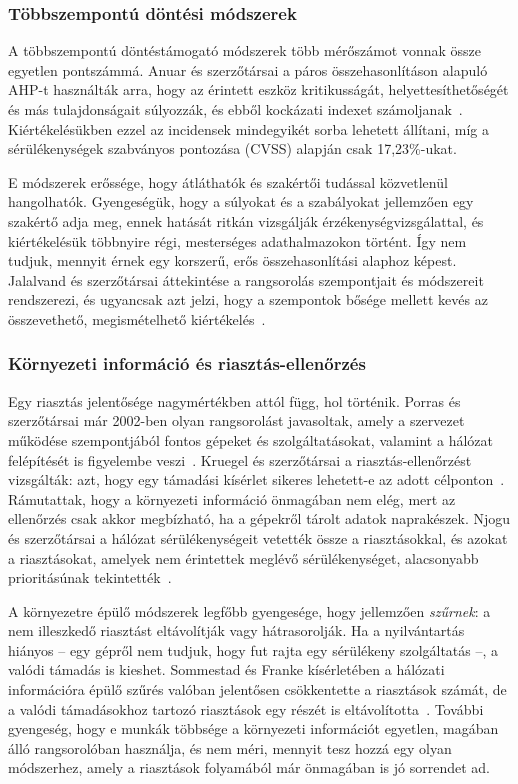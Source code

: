 \subsubsection{Többszempontú döntési módszerek}
A többszempontú döntéstámogató módszerek több mérőszámot vonnak össze egyetlen pontszámmá. Anuar és szerzőtársai a páros összehasonlításon alapuló \ac{AHP}-t használták arra, hogy az érintett eszköz kritikusságát, helyettesíthetőségét és más tulajdonságait súlyozzák, és ebből kockázati indexet számoljanak~\cite{anuar2012}. Kiértékelésükben ezzel az incidensek mindegyikét sorba lehetett állítani, míg a sérülékenységek szabványos pontozása (\ac{CVSS}) alapján csak 17,23\%-ukat.

E módszerek erőssége, hogy átláthatók és szakértői tudással közvetlenül hangolhatók. Gyengeségük, hogy a súlyokat és a szabályokat jellemzően egy szakértő adja meg, ennek hatását ritkán vizsgálják érzékenységvizsgálattal, és kiértékelésük többnyire régi, mesterséges
adathalmazokon történt. Így nem tudjuk, mennyit érnek egy korszerű, erős összehasonlítási alaphoz képest. Jalalvand és szerzőtársai áttekintése a rangsorolás szempontjait és módszereit rendszerezi, és ugyancsak azt jelzi, hogy a szempontok bősége mellett kevés az összevethető, megismételhető kiértékelés~\cite{jalalvand2024}.

\subsubsection{Környezeti információ és riasztás-ellenőrzés}
Egy riasztás jelentősége nagymértékben attól függ, hol történik. Porras és szerzőtársai már 2002-ben olyan rangsorolást javasoltak, amely a szervezet működése szempontjából fontos gépeket és szolgáltatásokat, valamint a hálózat felépítését is figyelembe veszi~\cite{porras2002}. Kruegel és szerzőtársai a riasztás-ellenőrzést vizsgálták: azt, hogy egy támadási kísérlet sikeres lehetett-e az adott célponton~\cite{kruegel2004verification}. Rámutattak, hogy a környezeti információ önmagában nem elég, mert az ellenőrzés csak akkor megbízható, ha a gépekről tárolt adatok naprakészek. Njogu és szerzőtársai a hálózat sérülékenységeit vetették össze a riasztásokkal, és azokat a riasztásokat, amelyek nem érintettek meglévő sérülékenységet, alacsonyabb prioritásúnak tekintették~\cite{njogu2012}.

A környezetre épülő módszerek legfőbb gyengesége, hogy jellemzően \emph{szűrnek}: a nem illeszkedő riasztást eltávolítják vagy hátrasorolják. Ha a nyilvántartás hiányos -- egy gépről nem tudjuk, hogy fut rajta egy sérülékeny szolgáltatás --, a valódi támadás is kieshet. Sommestad és Franke kísérletében a hálózati információra épülő szűrés valóban jelentősen csökkentette a riasztások számát, de a valódi támadásokhoz tartozó riasztások egy részét is eltávolította~\cite{sommestad2015}. További gyengeség, hogy e munkák többsége a környezeti információt egyetlen, magában álló rangsorolóban használja, és nem méri, mennyit tesz hozzá egy olyan módszerhez, amely a riasztások folyamából már önmagában is jó sorrendet ad.

